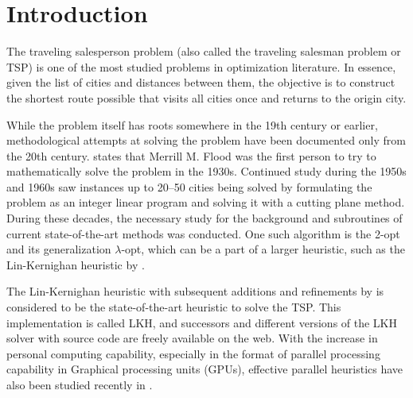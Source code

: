\documentclass[english, 12pt, a4paper, sci, utf8, a-1b, online]{aaltothesis}
\begin{document}

%
%
%



\thesistableofcontents

\cleardoublepage

\section{Introduction}
The traveling salesperson problem (also called the traveling salesman problem or TSP) is one of the most studied problems in optimization literature. In essence, given the list of cities and distances between them, the objective is to construct the shortest route possible that visits all cities once and returns to the origin city.

While the problem itself has roots somewhere in the 19th century or earlier, methodological attempts at solving the problem have been documented only from the 20th century. \cite{lawler1985travelling} states that Merrill M. Flood was the first person to try to mathematically solve the problem in the 1930s. Continued study during the 1950s and 1960s saw instances up to 20--50 cities being solved by formulating the problem as an integer linear program and solving it with a cutting plane method. During these decades, the necessary study for the background and subroutines of current state-of-the-art methods was conducted. One such algorithm is the 2-opt \cite{2opt} and its generalization $\lambda$-opt, which can be a part of a larger heuristic, such as the Lin-Kernighan heuristic by \cite{linkernighan}.

The Lin-Kernighan heuristic with subsequent additions and refinements by \cite{HELSGAUN2000106} is considered to be the state-of-the-art heuristic to solve the TSP. This implementation is called LKH, and successors and different versions of the LKH solver with source code are freely available on the web. With the increase in personal computing capability, especially in the format of parallel processing capability in Graphical processing units (GPUs), effective parallel heuristics have also been studied recently in \cite{6217493}.
\end{document}
